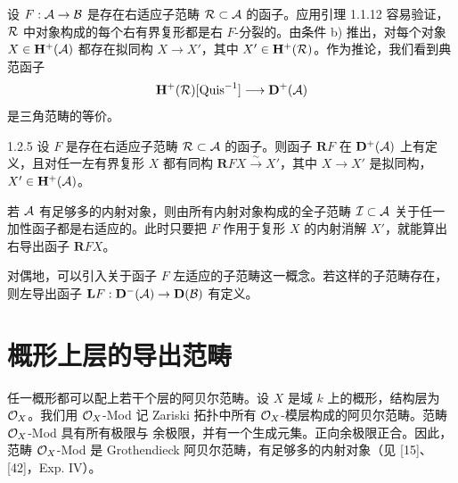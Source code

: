 设 $F:\mathcal{A}\to\mathcal{B}$ 是存在右适应子范畴 $\mathcal{R}\subset\mathcal{A}$ 的函子。应用引理 1.1.12 容易验证，$\mathcal{R}$ 中对象构成的每个右有界复形都是右 $F$-分裂的。由条件 b) 推出，对每个对象 $X\in\mathbf{H}^{+}(\mathcal{A})$ 都存在拟同构 $X\to X'$，其中 $X'\in\mathbf{H}^{+}(\mathcal{R})$。作为推论，我们看到典范函子
\begin{equation*}
\mathbf{H}^{+}(\mathcal{R})[\mathrm{Quis}^{-1}]\longrightarrow\mathbf{D}^{+}(\mathcal{A})
\end{equation*}
是三角范畴的等价。

\begin{lemma}{1.2.5}
设 $F$ 是存在右适应子范畴 $\mathcal{R}\subset\mathcal{A}$ 的函子。则函子 $\mathbf{R}F$ 在 $\mathbf{D}^{+}(\mathcal{A})$ 上有定义，且对任一左有界复形 $X$ 都有同构 $\mathbf{R}FX\xrightarrow{\ \sim\ }X'$，其中 $X\to X'$ 是拟同构，$X'\in\mathbf{H}^{+}(\mathcal{A})$。
\end{lemma}

若 $\mathcal{A}$ 有足够多的内射对象，则由所有内射对象构成的全子范畴 $\mathcal{I}\subset\mathcal{A}$ 关于任一加性函子都是右适应的。此时只要把 $F$ 作用于复形 $X$ 的内射消解 $X'$，就能算出右导出函子 $\mathbf{R}FX$。

对偶地，可以引入关于函子 $F$ 左适应的子范畴这一概念。若这样的子范畴存在，则左导出函子 $\mathbf{L}F:\mathbf{D}^{-}(\mathcal{A})\to\mathbf{D}(\mathcal{B})$ 有定义。

\section{概形上层的导出范畴}

任一概形都可以配上若干个层的阿贝尔范畴。设 $X$ 是域 $k$ 上的概形，结构层为 $\mathcal{O}_X$。我们用 $\mathcal{O}_X$-Mod 记 Zariski 拓扑中所有 $\mathcal{O}_X$-模层构成的阿贝尔范畴。范畴 $\mathcal{O}_X$-Mod 具有所有极限与
余极限，并有一个生成元集。正向余极限正合。因此，范畴 $\mathcal{O}_X$-Mod 是 Grothendieck 阿贝尔范畴，有足够多的内射对象（见 [15]、[42]，Exp. IV）。

